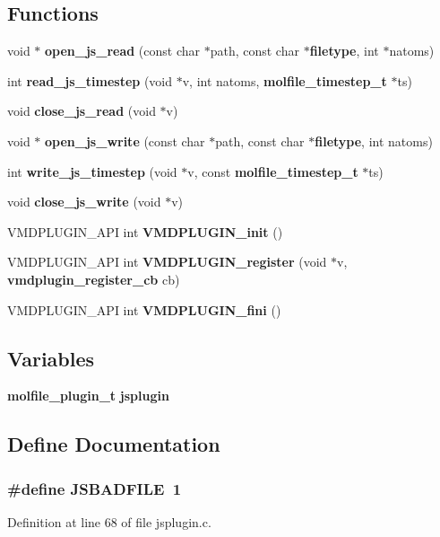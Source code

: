 \subsection*{Functions}
\begin{CompactItemize}
\item 
void $\ast$ {\bf open\_\-js\_\-read} (const char $\ast$path, const char $\ast${\bf filetype}, int $\ast$natoms)
\item 
int {\bf read\_\-js\_\-timestep} (void $\ast$v, int natoms, {\bf molfile\_\-timestep\_\-t} $\ast$ts)
\item 
void {\bf close\_\-js\_\-read} (void $\ast$v)
\item 
void $\ast$ {\bf open\_\-js\_\-write} (const char $\ast$path, const char $\ast${\bf filetype}, int natoms)
\item 
int {\bf write\_\-js\_\-timestep} (void $\ast$v, const {\bf molfile\_\-timestep\_\-t} $\ast$ts)
\item 
void {\bf close\_\-js\_\-write} (void $\ast$v)
\item 
VMDPLUGIN\_\-API int {\bf VMDPLUGIN\_\-init} ()
\item 
VMDPLUGIN\_\-API int {\bf VMDPLUGIN\_\-register} (void $\ast$v, {\bf vmdplugin\_\-register\_\-cb} cb)
\item 
VMDPLUGIN\_\-API int {\bf VMDPLUGIN\_\-fini} ()
\end{CompactItemize}
\subsection*{Variables}
\begin{CompactItemize}
\item 
{\bf molfile\_\-plugin\_\-t} {\bf jsplugin}
\end{CompactItemize}


\subsection{Define Documentation}
\subsubsection{\setlength{\rightskip}{0pt plus 5cm}\#define JSBADFILE\ 1}\label{jsplugin_8c_a8}




Definition at line 68 of file jsplugin.c.
